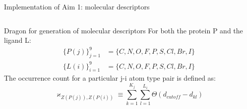 \begin{frame}{Implementation of Aim 1: molecular descriptors}
\begin{columns}
\begin{column}{0.55\textwidth}
\begin{block}{Dragon for generation of molecular descriptors}
For both the protein P and the ligand L:
\begin{equation*}
\begin{aligned}
\{ P(j)\}_{j=1}^9 &= \{C,N,O,F,P,S,Cl,Br,I\} \\
\{L(i)\}_{i=1}^9 &= \{C,N,O,F,P,S,Cl,Br,I\}
\end{aligned}
\end{equation*}
The occurrence count for a particular j-i atom type pair is defined as:
\begin{equation*}
\varkappa _{Z(P(j)),Z(P(i))} \equiv \sum_{k=1}^{K_j} \sum_{l=1}^{L_i} \Theta (d_{cutoff}-d_{kl})
\end{equation*}
\end{block}
    \end{column}
    \end{columns}
\end{frame}


